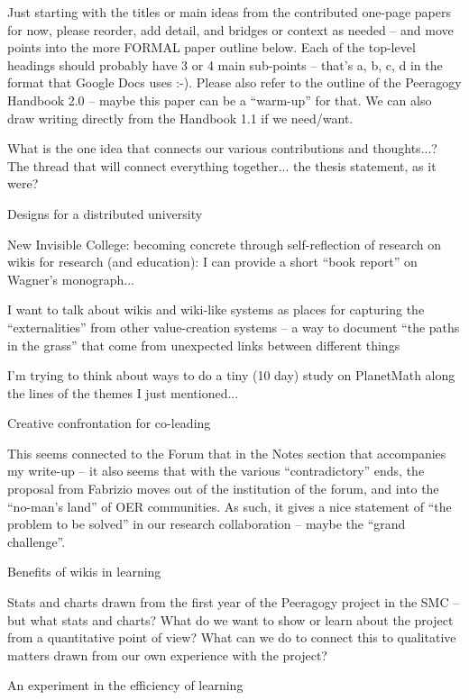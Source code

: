 \documentclass[twoside]{article}
\begin{document}
\begin{multicols}{2}
Just starting with the titles or main ideas from the contributed one-page papers for now, please reorder, add detail, and bridges or context as needed -- and move points into the more FORMAL paper outline below. Each of the top-level headings should probably have 3 or 4 main sub-points -- that's a, b, c, d in the format that Google Docs uses :-). Please also refer to the outline of the Peeragogy Handbook 2.0 -- maybe this paper can be a ``warm-up'' for that. We can also draw writing directly from the Handbook 1.1 if we need/want.

        What is the one idea that connects our various contributions and thoughts...? The thread that will connect everything together... the thesis statement, as it were?

    Designs for a distributed university

        New Invisible College: becoming concrete through self-reflection of research on wikis for research (and education): I can provide a short ``book report'' on Wagner's monograph...

        I want to talk about wikis and wiki-like systems as places for capturing the ``externalities'' from other value-creation systems -- a way to document ``the paths in the grass'' that come from unexpected links between different things

        I'm trying to think about ways to do a tiny (10 day) study on PlanetMath along the lines of the themes I just mentioned...

    Creative confrontation for co-leading

        This seems connected to the Forum that in the Notes section that accompanies my write-up -- it also seems that with the various ``contradictory'' ends, the proposal from Fabrizio moves out of the institution of the forum, and into the ``no-man's land'' of OER communities. As such, it gives a nice statement of ``the problem to be solved'' in our research collaboration -- maybe the ``grand challenge''.

    Benefits of wikis in learning

        Stats and charts drawn from the first year of the Peeragogy project in the SMC -- but what stats and charts? What do we want to show or learn about the project from a quantitative point of view? What can we do to connect this to qualitative matters drawn from our own experience with the project?

    An experiment in the efficiency of learning


\end{multicols}
\end{document}
